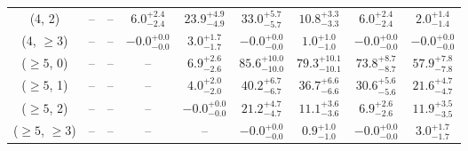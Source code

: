 \begin{table}[h!]
{\begin{tabular}{ccccccccc}
	(4, 2) & -- & -- & $6.0^{+ 2.4 }_{- 2.4 }$ & $23.9^{+ 4.9 }_{- 4.9 }$ & $33.0^{+ 5.7 }_{- 5.7 }$ & $10.8^{+ 3.3 }_{- 3.3 }$ & $6.0^{+ 2.4 }_{- 2.4 }$ & $2.0^{+ 1.4 }_{- 1.4 }$ \\[0.5ex] 
	(4, $\ge3$) & -- & -- & $-0.0^{+ 0.0 }_{- 0.0 }$ & $3.0^{+ 1.7 }_{- 1.7 }$ & $-0.0^{+ 0.0 }_{- 0.0 }$ & $1.0^{+ 1.0 }_{- 1.0 }$ & $-0.0^{+ 0.0 }_{- 0.0 }$ & $-0.0^{+ 0.0 }_{- 0.0 }$ \\[0.5ex] 
	($\ge5$, 0) & -- & -- & -- & $6.9^{+ 2.6 }_{- 2.6 }$ & $85.6^{+ 10.0 }_{- 10.0 }$ & $79.3^{+ 10.1 }_{- 10.1 }$ & $73.8^{+ 8.7 }_{- 8.7 }$ & $57.9^{+ 7.8 }_{- 7.8 }$ \\[0.5ex] 
	($\ge5$, 1) & -- & -- & -- & $4.0^{+ 2.0 }_{- 2.0 }$ & $40.2^{+ 6.7 }_{- 6.7 }$ & $36.7^{+ 6.6 }_{- 6.6 }$ & $30.6^{+ 5.6 }_{- 5.6 }$ & $21.6^{+ 4.7 }_{- 4.7 }$ \\[0.5ex] 
	($\ge5$, 2) & -- & -- & -- & $-0.0^{+ 0.0 }_{- 0.0 }$ & $21.2^{+ 4.7 }_{- 4.7 }$ & $11.1^{+ 3.6 }_{- 3.6 }$ & $6.9^{+ 2.6 }_{- 2.6 }$ & $11.9^{+ 3.5 }_{- 3.5 }$ \\[0.5ex] 
	($\ge5$, $\ge3$) & -- & -- & -- & -- & $-0.0^{+ 0.0 }_{- 0.0 }$ & $0.9^{+ 1.0 }_{- 1.0 }$ & $-0.0^{+ 0.0 }_{- 0.0 }$ & $3.0^{+ 1.7 }_{- 1.7 }$ \\[0.5ex] 
	\hline
	\hline
\end{tabular}}
\end{table}
